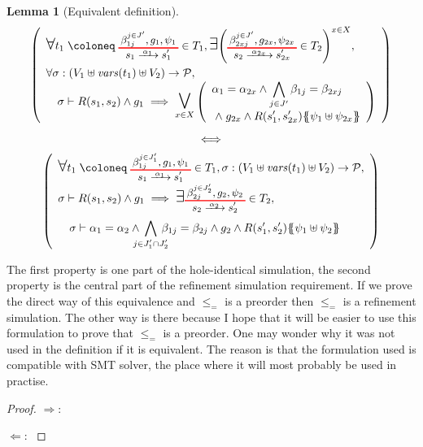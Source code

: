\documentclass{article}
\theoremstyle{plain}
\newtheorem{lem}{Lemma}
\theoremstyle{definition}
\newcommand\nmm[1]{\(\displaystyle #1\)} %
\newcommand\mpar[1]{{\left(#1\right)}}
\newcommand\mbrc[1]{{\left\{#1\right\}}}
\newcommand\psubst[1]{\mbrc{\!\!\mbrc{#1}\!\!}}
\newcommand\subbox[1]{{\makebox[.5\width]{\(\scriptstyle #1\)}}}
\newcommand\bigsymb[2][\Large]{\text{#1\nmm{#2}}} %
\newcommand\defobject{\DOTSB\;{\coloneq}\;}
\newcommand\nwedge{\DOTSB\;{\wedge}\;} %
\newcommand\fvars[1]{{\mathit{vars}\mpar{#1}}}
\newcommand\values{{\mathcal{P}}}
\newcommand\OT[6]{\text{\small\(%
	\setlength\arraycolsep{2pt}\everymath{\displaystyle}%
	\renewcommand\arraystretch{1}%
	\begin{array}{c}%
	#4,#5,#6 \\\noalign{\color{red}\hrule height 1pt}
	#1\xrightarrow{\raisebox{-1.5pt}[.8\height][0pt]{\makebox[1.4\width]{\(\scriptstyle #3\)}}}#2
	\end{array}\)}}
\newcommand\OTx[4]{\OT{s_{#1}}{s'_{#1 #2}}{\alpha_{#1 #2}}{\beta_{#3 j}^{j \in J'_{#4}}}{g_{#1 #2}}{\psi_{#1 #2}}}
\begin{document}
\begin{lem}[Equivalent definition] %
\begin{gather*}
\mpar{\everymath{\displaystyle}\begin{array}{l}
	\bigsymb{\forall} t_1 \defobject \OTx{1}{}{1}{} \in T_1, \bigsymb{\exists} \mpar{\OTx{2}{x}{2x}{} \in T_2}^{x \in X}, \\[12pt]
	\forall \sigma: \mpar{V_1 \uplus \fvars{t_1} \uplus V_2} \to \values, \\
	\quad \sigma \vdash R\mpar{s_1, s_2} \wedge g_1 \implies \operatorname*{\bigsymb{\bigvee}}_{x \in X} \mpar{\begin{array}{l}
		\alpha_1 = \alpha_{2x} \wedge \bigwedge_{j \in J'} \beta_{1j} = \beta_{2xj} \\[12pt]
		\nwedge g_{2x} \wedge R\mpar{s'_1, s'_{2x}}\psubst{\psi_1 \uplus \psi_{2x}}
	\end{array}}
\end{array}} \\
\iff \\
\mpar{\everymath{\displaystyle}\begin{array}{l}
	\bigsymb{\forall} t_1 \defobject \OTx{1}{}{1}{1} \in T_1, \sigma: \mpar{V_1 \uplus \fvars{t_1} \uplus V_2} \to \values, \\[6pt]
	\sigma \vdash R\mpar{s_1, s_2} \wedge g_1 \implies \bigsymb{\exists} \OTx{2}{}{2}{2} \in T_2, \\[12pt]
	\quad \sigma \vdash \alpha_1 = \alpha_2 \wedge \bigwedge_\subbox{j \in J'_1 \cap J'_2} \beta_{1j} = \beta_{2j} \wedge g_2 \wedge R\mpar{s'_1, s'_2}\psubst{\psi_1 \uplus \psi_2}
\end{array}}
\end{gather*}
\end{lem}
The first property is one part of the hole-identical simulation, the second property is the central part of the refinement simulation requirement.
If we prove the direct way of this equivalence and \(\leq_=\) is a preorder then \(\leq_=\) is a refinement simulation.
The other way is there because I hope that it will be easier to use this formulation to prove that \(\leq_=\) is a preorder. %
One may wonder why it was not used in the definition if it is equivalent.
The reason is that the formulation used is compatible with SMT solver, the place where it will most probably be used in practise.
\begin{proof}
\item[\(\Rightarrow\):] \(\) %
\item[\(\Leftarrow\):] \(\) %
\end{proof}
\end{document}
